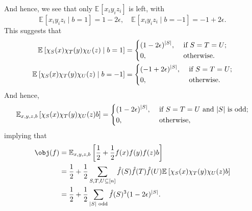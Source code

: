 And hence, we see that only \(\mathbb{E}_{}\left[x_i y_i z_i \right] \) is left, with
\[
	\mathbb{E}_{}\left[x_i y_i z_i \mid b= 1 \right] = 1 - 2\epsilon,
	\quad \mathbb{E}_{}\left[x_i y_i z_i \mid b= -1 \right] = -1 + 2\epsilon.
\]
This suggests that
\[
	\begin{split}
		\mathbb{E}_{}\left[\chi _S(x) \chi _T(y) \chi _U(z) \mid b=1 \right]  & = \begin{dcases}
			                                                                          (1-2\epsilon )^{\vert S \vert }, & \text{ if } S=T=U ;  \\
			                                                                          0,                               & \text{ otherwise}  .
		                                                                          \end{dcases}  \\
		\mathbb{E}_{}\left[\chi _S(x) \chi _T(y) \chi _U(z) \mid b=-1 \right] & = \begin{dcases}
			                                                                          (-1+2\epsilon )^{\vert S \vert }, & \text{ if } S=T=U ;  \\
			                                                                          0,                                & \text{ otherwise}  .
		                                                                          \end{dcases}
	\end{split}
\]
And hence,
\[
	\mathbb{E}_{x, y, z, b}\left[\chi _S(x) \chi _T(y) \chi _U(z) b \right] = \begin{dcases}
		(1 - 2\epsilon )^{\vert S \vert }, & \text{ if } S=T=U \text{ and \(\vert S \vert \) is odd}; \\
		0,                                 & \text{ otherwise} ,
	\end{dcases}
\]
implying that
\[
	\begin{split}
		\obj(f)
		 & = \mathbb{E}_{x, y, z, b}\left[\frac{1}{2} + \frac{1}{2} f(x) f(y) f(z) b \right]                                                                          \\
		 & = \frac{1}{2} + \frac{1}{2} \sum_{S, T, U \subseteq [n]} \hat{f} (S) \hat{f} (T) \hat{f} (U) \mathbb{E}_{}\left[\chi _S(x) \chi _T(y) \chi _U(z) b \right] \\
		 & = \frac{1}{2} + \frac{1}{2} \sum_{\vert S \vert \text{ odd}} \hat{f} (S)^3 (1 - 2\epsilon )^{\vert S \vert }.
	\end{split}
\]
